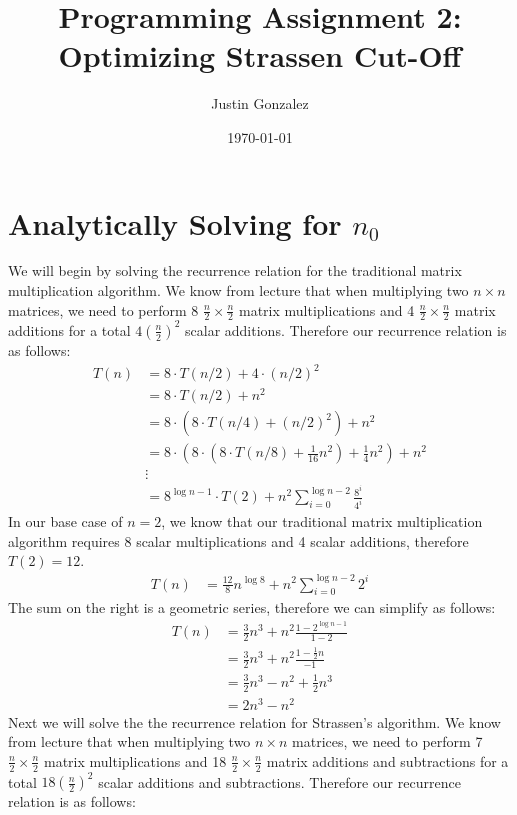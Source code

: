 \documentclass{article}
\title{Programming Assignment 2:\\ \bigskip
\Large Optimizing Strassen Cut-Off}
\author{Justin Gonzalez}
\date{\today}
\begin{document}
\maketitle
\onehalfspacing
\section{Analytically Solving for $n_0$}
We will begin by solving the recurrence relation for the traditional matrix multiplication algorithm. We know from lecture that when multiplying two $n \times n$ matrices, we need to perform 8 $\frac{n}{2} \times \frac{n}{2}$ matrix multiplications and 4 $\frac{n}{2} \times \frac{n}{2}$ matrix additions for a total $4 (\frac{n}{2})^2$ scalar additions. Therefore our recurrence relation is as follows:
\begin{align*}
    T(n) &= 8 \cdot T(n/2) + 4 \cdot (n/2)^2 \\
    &= 8 \cdot T(n/2) + n^2 \\
    &=8 \cdot (8 \cdot T(n/4) + (n/2)^2) + n^2 \\
    &=8 \cdot (8 \cdot (8 \cdot T(n/8) + \frac{1}{16}n^2) + \frac{1}{4}n^2) + n^2 \\
    &\vdots \\
    &= 8^{\log n - 1} \cdot T(2) + n^2 \sum_{i=0}^{\log n - 2} \frac{8^i}{4^i}
\end{align*}
In our base case of $n=2$, we know that our traditional matrix multiplication algorithm requires 8 scalar multiplications and 4 scalar additions, therefore $T(2)=12$.
\begin{align*}
    T(n) &= \frac{12}{8}n^{\log 8} + n^2 \sum_{i=0}^{\log n - 2} 2^i
\end{align*}
The sum on the right is a geometric series, therefore we can simplify as follows:
\begin{align*}
    T(n) &= \frac{3}{2}n^{3} + n^2 \frac{1-2^{\log n - 1}}{1-2}\\
    &= \frac{3}{2}n^{3} + n^2 \frac{1-\frac{1}{2}n}{-1}\\
    &= \frac{3}{2}n^{3} - n^2 + \frac{1}{2}n^3 \\
    &= 2n^{3} - n^2
\end{align*}
Next we will solve the the recurrence relation for Strassen's algorithm. We know from lecture that when multiplying two $n \times n$ matrices, we need to perform 7 $\frac{n}{2} \times \frac{n}{2}$ matrix multiplications and 18 $\frac{n}{2} \times \frac{n}{2}$ matrix additions and subtractions for a total $18 (\frac{n}{2})^2$ scalar additions and subtractions. Therefore our recurrence relation is as follows:
\end{document}
